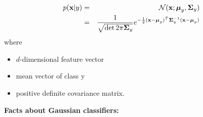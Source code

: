   \begin{eqnarray*}
     p(\bm{\mathrm{x}} | y) &=& \mathcal {N} (\bm{\mathrm{x}} ;\bm{\mathrm{\mu}}_y, \mathbf{\Sigma}_y) \\
                   &=& \frac{1}{\sqrt{\det 2\pi  \mathbf{\Sigma}_y}} 
                       e^{-\frac{1}{2}(\bm{\mathrm{x}} -\bm{\mathrm{\mu}}_y)^T \mathbf{\Sigma}_y^{-1}(\bm{\mathrm{x}} - \bm{\mathrm{\mu}}_y)}
  \end{eqnarray*}
  where
%
  \begin{center}
    \begin{minipage}{0.6\textwidth}
      \begin{itemize}
        \item[$\vect x \in \real^d$:] $d$-dimensional feature vector\\
        \item[$\vect {\mu}_y \in \real^d $:] mean vector of class y\\
        \item[$ \mat\Sigma_y \in \real^{d\times d}$:] positive definite covariance matrix.
      \end{itemize}
    \end{minipage}
  \end{center}
  
  \textbf{Facts about Gaussian classifiers:}

